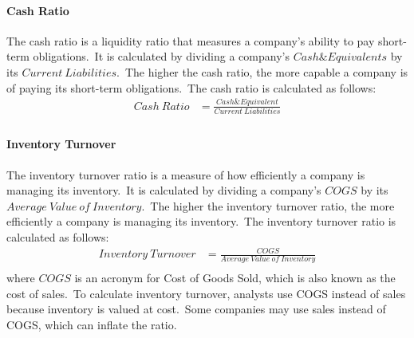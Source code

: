 \documentclass[../xlapes02]{subfiles}
\begin{document}
    \paragraph{Cash Ratio}\label{par:cash-ratio}
    The cash ratio is a liquidity ratio that measures a company's ability to pay short-term obligations.\ It is calculated by dividing a company's $Cash\&Equivalents$ by its $Current\ Liabilities$.\ The higher the cash ratio, the more capable a company is of paying its short-term obligations.\ The cash ratio is calculated as follows:
    \begin{equation}
        \label{eq:cash-ratio}
        \begin{split}
            Cash\ Ratio&=\frac{Cash\&Equivalent}{Current\ Liabilities}\\
        \end{split}
    \end{equation}

    \paragraph{Inventory Turnover}\label{par:inventory-turnover}
    The inventory turnover ratio is a measure of how efficiently a company is managing its inventory.\ It is calculated by dividing a company's $COGS$ by its $Average\ Value\ of\ Inventory$.\ The higher the inventory turnover ratio, the more efficiently a company is managing its inventory.\ The inventory turnover ratio is calculated as follows:
    \begin{equation}
        \label{eq:inventory-turnover}
        \begin{split}
            Inventory\ Turnover&=\frac{COGS}{Average\ Value\ of\ Inventory}\\
        \end{split}
    \end{equation}
    where $COGS$ is an acronym for Cost of Goods Sold, which is also known as the cost of sales.\ To calculate inventory turnover, analysts use COGS instead of sales because inventory is valued at cost.\ Some companies may use sales instead of COGS, which can inflate the ratio.
\end{document}
